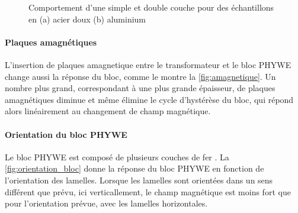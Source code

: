 \begin{figure}[h]
\begin{subfigure}{0.5\linewidth}
        \caption{}
        \label{fig:alu_combo}
    \end{subfigure}
    \caption{Comportement d'une simple et double couche pour des échantillons en (a) acier doux (b) aluminium}
    \label{fig:combo}
\end{figure}

\paragraph{Plaques amagnétiques}
L'insertion de plaques amagnetique entre le transformateur et le bloc PHYWE change aussi la réponse du bloc, comme le montre la \autoref{fig:amagnetique}. Un nombre plus grand, correspondant à une plus grande épaisseur, de plaques amagnétiques diminue et même élimine le cycle d'hystérèse du bloc, qui répond alors linéairement au changement de champ magnétique.

\paragraph{Orientation du bloc PHYWE}
Le bloc PHYWE est composé de plusieurs couches de fer \cite{bloc_phywe}. La \autoref{fig:orientation_bloc} donne la réponse du bloc PHYWE en fonction de l'orientation des lamelles. Lorsque les lamelles sont orientées dans un sens différent que prévu, ici verticallement, le champ magnétique est moins fort que pour l'orientation prévue, avec les lamelles horizontales.

